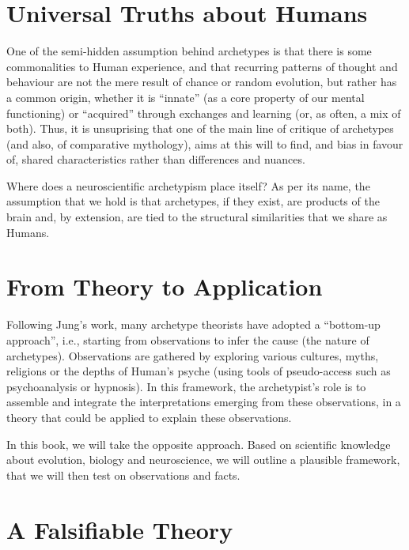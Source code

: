 \documentclass[
]{book}
\begin{document}
\hypertarget{universal-truths-about-humans}{%
\section{Universal Truths about Humans}\label{universal-truths-about-humans}}

One of the semi-hidden assumption behind archetypes is that there is some commonalities to Human experience, and that recurring patterns of thought and behaviour are not the mere result of chance or random evolution, but rather has a common origin, whether it is ``innate'' (as a core property of our mental functioning) or ``acquired'' through exchanges and learning (or, as often, a mix of both). Thus, it is unsuprising that one of the main line of critique of archetypes (and also, of comparative mythology), aims at this will to find, and bias in favour of, shared characteristics rather than differences and nuances.

Where does a neuroscientific archetypism place itself? As per its name, the assumption that we hold is that archetypes, if they exist, are products of the brain and, by extension, are tied to the structural similarities that we share as Humans.

\hypertarget{from-theory-to-application}{%
\section{From Theory to Application}\label{from-theory-to-application}}

Following Jung's work, many archetype theorists have adopted a ``bottom-up approach'', i.e., starting from observations to infer the cause (the nature of archetypes). Observations are gathered by exploring various cultures, myths, religions or the depths of Human's psyche (using tools of pseudo-access such as psychoanalysis or hypnosis). In this framework, the archetypist's role is to assemble and integrate the interpretations emerging from these observations, in a theory that could be applied to explain these observations.

In this book, we will take the opposite approach. Based on scientific knowledge about evolution, biology and neuroscience, we will outline a plausible framework, that we will then test on observations and facts.

\hypertarget{a-falsifiable-theory}{%
\section{A Falsifiable Theory}\label{a-falsifiable-theory}}
\end{document}
